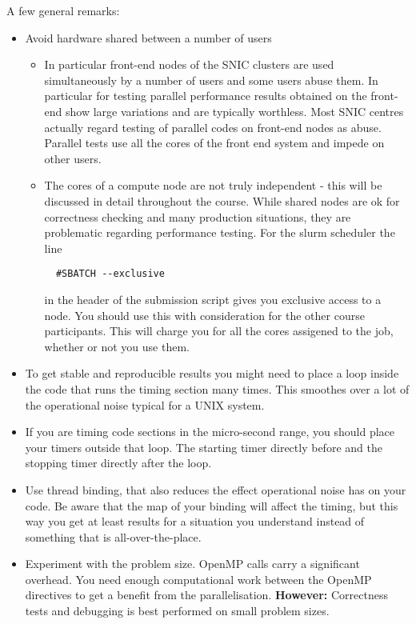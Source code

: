 \documentclass[a4paper,oneside,12pt]{article}
\begin{document}
A few general remarks:
\begin{itemize}
\item Avoid hardware shared between a number of users  
\begin{itemize}
\item In particular front-end nodes of the SNIC clusters are used simultaneously by a number of users and some users abuse them.  In particular for testing parallel performance results obtained on the front-end show large variations and are typically worthless.  Most SNIC centres actually regard testing of parallel codes on front-end nodes as abuse.  Parallel tests use all the cores of the front end system and impede on other users.
\item The cores of a compute node are not truly independent - this will be discussed in detail throughout the course.  While shared nodes are ok for correctness checking and many production situations, they are problematic regarding performance testing.  For the slurm scheduler the line
\begin{verbatim}
  #SBATCH --exclusive
\end{verbatim}
in the header of the submission script gives you exclusive access to a node.  You should use this with consideration for the other course participants.  This will charge you for all the cores assigened to the job, whether or not you use them.
\end{itemize}
\item To get stable and reproducible results you might need to place a loop inside the code that runs the timing section many times.  This smoothes over a lot of the operational noise typical for a UNIX system.  

\item If you are timing code sections in the micro-second range, you should place your timers outside that loop.  The starting timer directly before and the stopping timer directly after the loop. 
\item Use thread binding, that also reduces the effect operational noise has on your code.  Be aware that the map of your binding will affect the timing, but this way you get at least results for a situation you understand instead of something that is all-over-the-place.
\item Experiment with the problem size.  OpenMP calls carry a significant overhead.  You need enough computational work between the OpenMP directives to get a benefit from the parallelisation. \textbf{However:} Correctness tests and debugging is best performed on small problem sizes.
\end{itemize}
\end{document}
